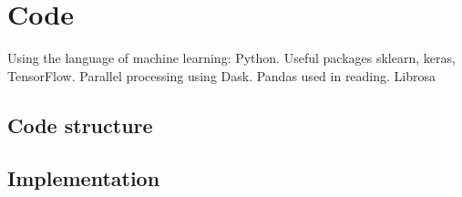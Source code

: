 \section{Code} \label{sec:code}
Using the language of machine learning: Python. Useful packages sklearn, keras, TensorFlow. Parallel processing using Dask. Pandas used in reading. Librosa

\subsection{Code structure} \label{sec:structure}

\subsection{Implementation}

